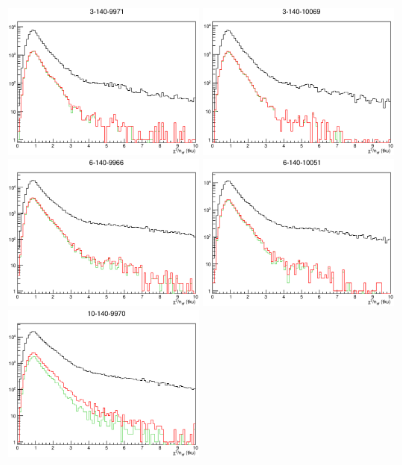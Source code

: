\begin{figure}[!tbh]
    \centering
    \includegraphics*[width=0.45\textwidth]{analysis_plots/plots_3-140-full/chi2_tku.eps}
    \includegraphics*[width=0.45\textwidth]{analysis_plots/plots_3-140-empty/chi2_tku.eps}
    \includegraphics*[width=0.45\textwidth]{analysis_plots/plots_6-140-full/chi2_tku.eps}
    \includegraphics*[width=0.45\textwidth]{analysis_plots/plots_6-140-empty/chi2_tku.eps}
    \includegraphics*[width=0.45\textwidth]{analysis_plots/plots_10-140-full/chi2_tku.eps}

\end{figure}
